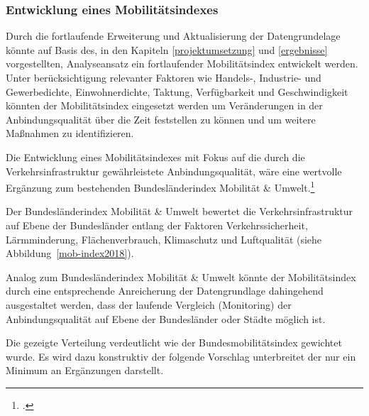 \subsubsection{Entwicklung eines Mobilitätsindexes}\label{mobwob_index}
Durch die fortlaufende Erweiterung und Aktualisierung der Datengrundelage könnte auf Basis des, in den Kapiteln \ref{projektumsetzung} und \ref{ergebnisse} vorgestellten, Analyseansatz ein fortlaufender Mobilitätsindex entwickelt werden. Unter berücksichtigung relevanter Faktoren wie Handels-, Industrie- und Gewerbedichte, Einwohnerdichte, Taktung, Verfügbarkeit und Geschwindigkeit könnten der Mobilitätsindex eingesetzt werden um Veränderungen in der Anbindungsqualität über die Zeit feststellen zu können und um weitere Maßnahmen zu identifizieren. 

Die Entwicklung eines Mobilitätsindexes mit Fokus auf die durch die Verkehrsinfrastruktur gewährleistete Anbindungsqualität, wäre eine wertvolle Ergänzung zum bestehenden Bundesländerindex Mobilität \& Umwelt.\footcite{Bundeslaenderindex:1}

Der Bundesländerindex Mobilität \& Umwelt bewertet die Verkehrsinfrastruktur auf Ebene der Bundesländer entlang der Faktoren Verkehrssicherheit, Lärmminderung, Flächenverbrauch, Klimaschutz und Luftqualität (siehe Abbildung~\ref{mob-index2018}).


Analog zum Bundesländerindex Mobilität \& Umwelt könnte der Mobilitätsindex durch eine entsprechende Anreicherung der Datengrundlage dahingehend ausgestaltet werden, dass der laufende Vergleich (Monitoring) der Anbindungsqualität auf Ebene der Bundesländer oder Städte möglich ist.


Die gezeigte Verteilung verdeutlicht wie der Bundesmobilitätsindex gewichtet wurde. Es wird dazu konstruktiv der folgende Vorschlag unterbreitet der nur ein Minimum an Ergänzungen darstellt.



